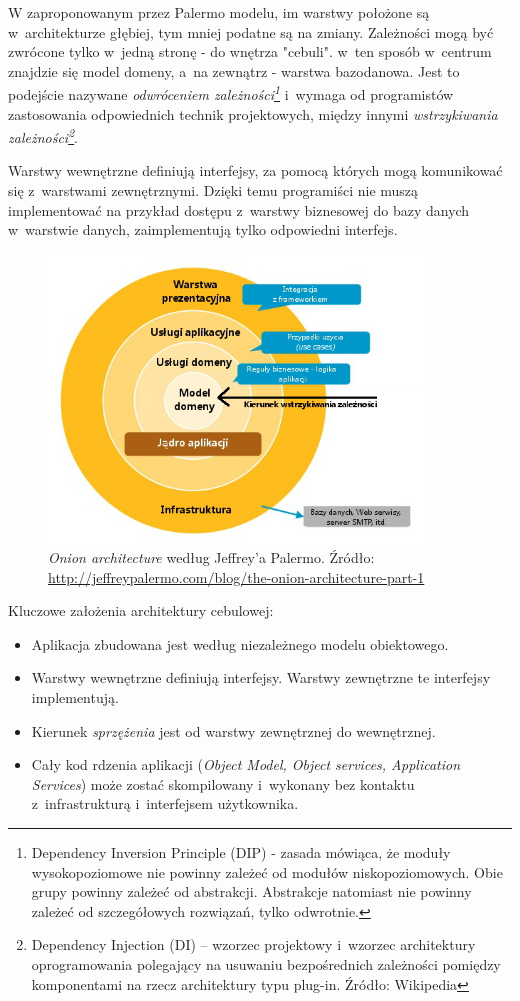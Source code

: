 W zaproponowanym przez Palermo modelu, im warstwy położone są w~architekturze głębiej, tym mniej podatne są na zmiany. Zależności mogą być zwrócone tylko w~jedną stronę - do wnętrza "cebuli". w~ten sposób w~centrum znajdzie się model domeny, a~na zewnątrz - warstwa bazodanowa. Jest to podejście nazywane \textit{odwróceniem zależności\footnote{Dependency Inversion Principle (DIP) - zasada mówiąca, że moduły wysokopoziomowe nie powinny zależeć od modułów niskopoziomowych. Obie grupy powinny zależeć od abstrakcji. Abstrakcje natomiast nie powinny zależeć od szczegółowych rozwiązań, tylko odwrotnie.}} i~wymaga od programistów zastosowania odpowiednich technik projektowych, między innymi \textit{wstrzykiwania zależności\footnote{Dependency Injection (DI) – wzorzec projektowy i~wzorzec architektury oprogramowania polegający na usuwaniu bezpośrednich zależności pomiędzy komponentami na rzecz architektury typu plug-in. Źródło: Wikipedia}}.

Warstwy wewnętrzne definiują interfejsy, za pomocą których mogą komunikować się z~warstwami zewnętrznymi. Dzięki temu programiści nie muszą implementować na przykład dostępu z~warstwy biznesowej do bazy danych w~warstwie danych, zaimplementują tylko odpowiedni interfejs.

\begin{figure}[!htb]
    \centering
    \includegraphics[width=10cm]{imgs/ch4_onion_architecture.jpg}
    \caption
{\textit{Onion architecture} według Jeffrey'a Palermo. Źródło: \url{http://jeffreypalermo.com/blog/the-onion-architecture-part-1}}
    \label{fig:onion_architecture}
\end{figure} 

Kluczowe założenia architektury cebulowej:
\begin{itemize}
\item 
Aplikacja zbudowana jest według niezależnego modelu obiektowego.
\item
Warstwy wewnętrzne definiują interfejsy. Warstwy zewnętrzne te interfejsy implementują.
\item
Kierunek \textit{sprzężenia} jest od warstwy zewnętrznej do wewnętrznej.
\item
Cały kod rdzenia aplikacji (\textit{Object Model, Object services, Application Services}) może zostać skompilowany i~wykonany bez kontaktu z~infrastrukturą i~interfejsem użytkownika.
\end{itemize}


